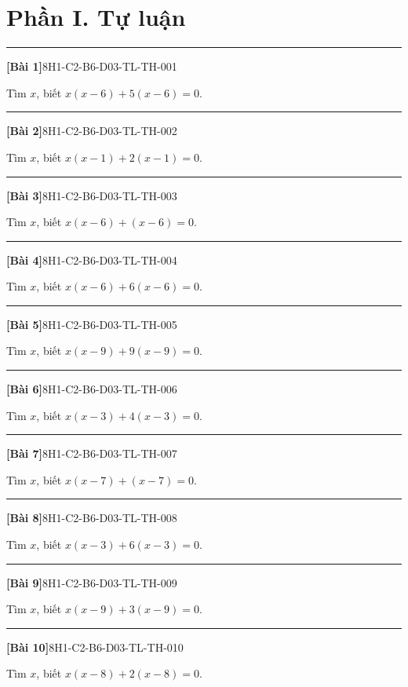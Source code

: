 \documentclass[12pt,a4paper]{article}
\newif\ifloigiai
\newenvironment{cauhoi}[2]{%
  \par\medskip\noindent\rule{\textwidth}{0.4pt}\par\nopagebreak
  \noindent\textbf{[#1]}\hfill{\scriptsize\ttfamily #2}\par\nopagebreak\smallskip}{\par}
\newcommand{\loigiai}[1]{\ifloigiai\par\smallskip\noindent\textit{Lời giải.} #1\par\fi}
\begin{document}
\section*{Phần I. Tự luận}
\begin{cauhoi}{Bài 1}{8H1-C2-B6-D03-TL-TH-001}
Tìm $x$, biết $x(x-6)+5(x-6)=0$.
\loigiai{Đặt nhân tử chung: $(x-6)(x+5)=0$. Suy ra $x=6$ hoặc $x=-5$.}
\end{cauhoi}
\begin{cauhoi}{Bài 2}{8H1-C2-B6-D03-TL-TH-002}
Tìm $x$, biết $x(x-1)+2(x-1)=0$.
\loigiai{Đặt nhân tử chung: $(x-1)(x+2)=0$. Suy ra $x=1$ hoặc $x=-2$.}
\end{cauhoi}
\begin{cauhoi}{Bài 3}{8H1-C2-B6-D03-TL-TH-003}
Tìm $x$, biết $x(x-6)+(x-6)=0$.
\loigiai{Đặt nhân tử chung: $(x-6)(x+1)=0$. Suy ra $x=6$ hoặc $x=-1$.}
\end{cauhoi}
\begin{cauhoi}{Bài 4}{8H1-C2-B6-D03-TL-TH-004}
Tìm $x$, biết $x(x-6)+6(x-6)=0$.
\loigiai{Đặt nhân tử chung: $(x-6)(x+6)=0$. Suy ra $x=6$ hoặc $x=-6$.}
\end{cauhoi}
\begin{cauhoi}{Bài 5}{8H1-C2-B6-D03-TL-TH-005}
Tìm $x$, biết $x(x-9)+9(x-9)=0$.
\loigiai{Đặt nhân tử chung: $(x-9)(x+9)=0$. Suy ra $x=9$ hoặc $x=-9$.}
\end{cauhoi}
\begin{cauhoi}{Bài 6}{8H1-C2-B6-D03-TL-TH-006}
Tìm $x$, biết $x(x-3)+4(x-3)=0$.
\loigiai{Đặt nhân tử chung: $(x-3)(x+4)=0$. Suy ra $x=3$ hoặc $x=-4$.}
\end{cauhoi}
\begin{cauhoi}{Bài 7}{8H1-C2-B6-D03-TL-TH-007}
Tìm $x$, biết $x(x-7)+(x-7)=0$.
\loigiai{Đặt nhân tử chung: $(x-7)(x+1)=0$. Suy ra $x=7$ hoặc $x=-1$.}
\end{cauhoi}
\begin{cauhoi}{Bài 8}{8H1-C2-B6-D03-TL-TH-008}
Tìm $x$, biết $x(x-3)+6(x-3)=0$.
\loigiai{Đặt nhân tử chung: $(x-3)(x+6)=0$. Suy ra $x=3$ hoặc $x=-6$.}
\end{cauhoi}
\begin{cauhoi}{Bài 9}{8H1-C2-B6-D03-TL-TH-009}
Tìm $x$, biết $x(x-9)+3(x-9)=0$.
\loigiai{Đặt nhân tử chung: $(x-9)(x+3)=0$. Suy ra $x=9$ hoặc $x=-3$.}
\end{cauhoi}
\begin{cauhoi}{Bài 10}{8H1-C2-B6-D03-TL-TH-010}
Tìm $x$, biết $x(x-8)+2(x-8)=0$.
\loigiai{Đặt nhân tử chung: $(x-8)(x+2)=0$. Suy ra $x=8$ hoặc $x=-2$.}
\end{cauhoi}
\end{document}
